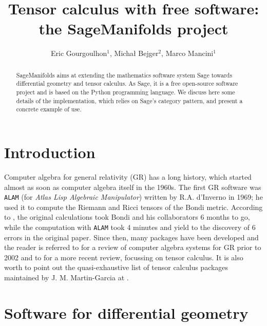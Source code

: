 \documentclass[a4paper]{jpconf}
\newcommand{\soft}[1]{\texttt{#1}}
\begin{document}
\title{Tensor calculus with free software: \\
the SageManifolds project}

\author{Eric Gourgoulhon$^1$, Micha\l{} Bejger$^2$, Marco Mancini$^1$}

\address{$^1$ Laboratoire Univers et Th\'eories, UMR 8102 du 
CNRS, Observatoire de Paris, Universit\'e Paris Diderot,
92190 Meudon, France}

\address{$^2$ Centrum Astronomiczne im. M. Kopernika, ul. Bartycka 18,
00-716 Warsaw, Poland}


\begin{abstract}
SageManifolds aims at extending the mathematics software system Sage towards
differential geometry and tensor calculus. As Sage, it is a free open-source
software project and is based on the Python programming language.
We discuss here some details of the implementation, which relies 
on Sage's category pattern, and present a concrete example of use.
\end{abstract}

\section{Introduction}

Computer algebra for general relativity (GR) has a long history, which started
almost as soon as computer algebra itself in the 1960s. 
The first GR software was \soft{ALAM} (for \emph{Atlas Lisp Algebraic Manipulator})
written by R.A. d'Inverno in 1969; he used it to compute
the Riemann and Ricci tensors of the Bondi metric.
According to \cite{Skea94}, 
the original calculations took Bondi and his collaborators 6 months to go,
while the computation with \soft{ALAM} took 4 minutes and yield to the 
discovery of 6 errors in the original paper. 
Since then, many packages have been developed and the reader is referred to \cite{MacCa02}
for a review of computer algebra
systems for GR prior to 2002 and to \cite{KorolKS13} for a more recent review,
focussing on tensor calculus. 
It is also worth to point out the quasi-exhaustive list of
tensor calculus packages maintained by J. M. Martin-Garcia at \cite{xact_links}.


\section{Software for differential geometry}
\end{document}
